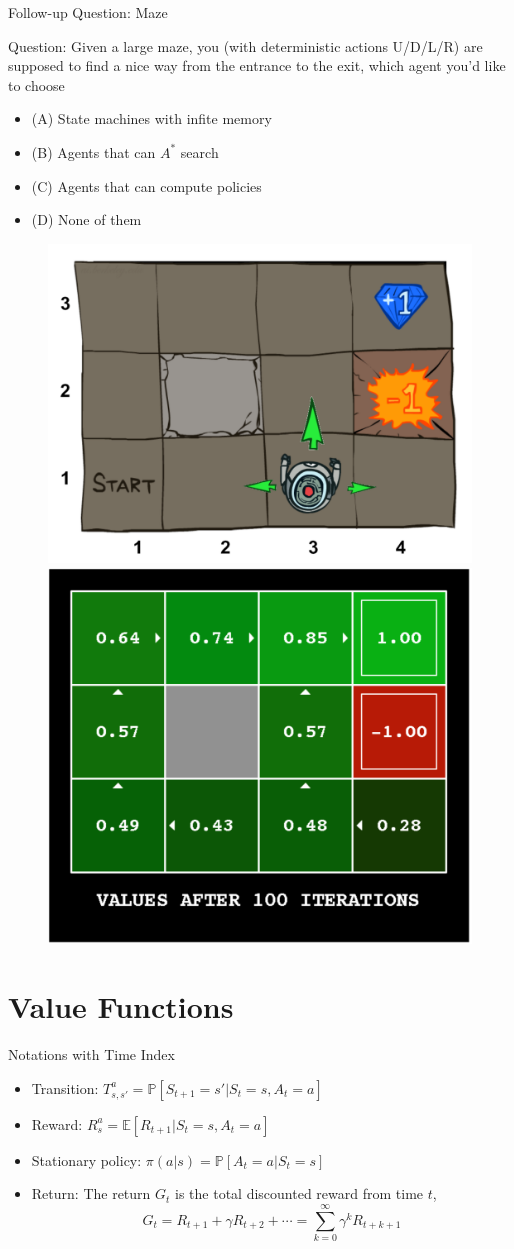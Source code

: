 \documentclass{beamer}
\begin{document}
\begin{frame}{Follow-up Question: Maze}
    \begin{exampleblock}{Question:}
        Given a large maze,
        you (with deterministic actions U/D/L/R) are supposed to find a nice way from the entrance to the exit,
        which agent you'd like to choose
        \begin{itemize}
            \item (A) State machines with infite memory
            \item (B) Agents that can $A^*$ search
            \item (C) Agents that can compute policies
            \item (D) None of them
        \end{itemize}
        
        \begin{figure}[htpb]
            \centering
            \includegraphics[width=0.3\linewidth]{pic/maze.png}
            \pause
            \includegraphics[width=0.25\linewidth]{pic/maze_ret.png}
        \end{figure}
    \end{exampleblock}
\end{frame}


\section{Value Functions}

\begin{frame}{Notations with Time Index}

\begin{itemize}
    \item \alert{Transition:}
    $T_{s,s'}^a = \mathbb{P}[S_{t+1}=s'|S_t=s, A_t=a]$
    \item \alert{Reward:}
    $R_{s}^a = \mathbb{E}[R_{t+1}|S_t=s, A_t=a]$
    \item \alert{Stationary policy:}
    $\pi(a|s) = \mathbb{P}[A_t = a | S_t=s]$
    \item \alert{Return:}
    The return $G_t$ is the total discounted reward from time $t$,
    \[
    G_t = R_{t+1} + \gamma R_{t+2} + \cdots
        = \sum_{k=0}^\infty \gamma^k R_{t+k+1}
    \]
\end{itemize}

\end{frame}
\end{document}

